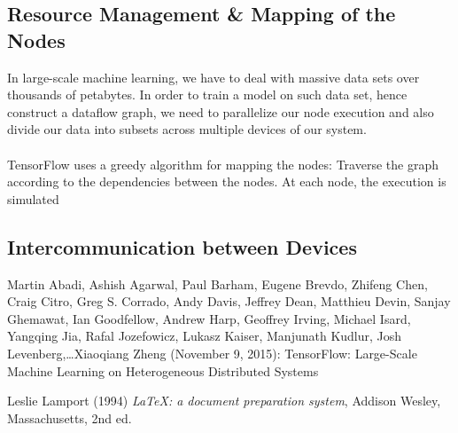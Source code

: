 \documentclass[ieeetran]{article}
\begin{document}
\subsection{Resource Management \& Mapping of the Nodes} %
\label{sub:mapping_of_nodes}
In large-scale machine learning, we have to deal with massive data sets over thousands of petabytes. In order to train a model on such data set, hence construct a dataflow graph, we need to parallelize our node execution and also divide our data into subsets across multiple devices of our system. 
\\ \\TensorFlow uses a greedy algorithm for mapping the nodes: Traverse the graph according to the dependencies between the nodes. At each node, the execution is simulated 




\subsection{Intercommunication between Devices} %
\label{sub:intercommunication_between_devices}





\pagebreak
\begin{thebibliography}{9}
Martin Abadi, Ashish Agarwal, Paul Barham, Eugene Brevdo, Zhifeng Chen, Craig Citro, Greg S. Corrado, Andy Davis, Jeffrey Dean, Matthieu Devin, Sanjay Ghemawat, Ian Goodfellow, Andrew Harp, Geoffrey Irving, Michael Isard, Yangqing Jia, Rafal Jozefowicz, Lukasz Kaiser, Manjunath Kudlur, Josh Levenberg,\ldots Xiaoqiang Zheng (November 9, 2015): TensorFlow: Large-Scale Machine Learning on Heterogeneous Distributed Systems 

Leslie Lamport (1994) \emph{\LaTeX: a document preparation system}, Addison
Wesley, Massachusetts, 2nd ed.
\end{thebibliography}
\end{document}

